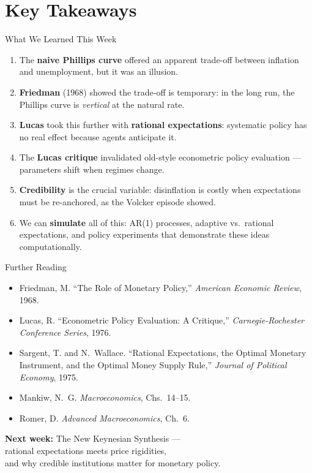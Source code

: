 \documentclass[aspectratio=169, 10pt]{beamer}
\begin{document}
\section{Key Takeaways}

\begin{frame}{What We Learned This Week}
\begin{enumerate}
  \item The \textbf{naive Phillips curve} offered an apparent trade-off between
        inflation and unemployment, but it was an illusion.
  \item \textbf{Friedman} (1968) showed the trade-off is temporary: in the long run,
        the Phillips curve is \textit{vertical} at the natural rate.
  \item \textbf{Lucas} took this further with \textbf{rational expectations}:
        systematic policy has no real effect because agents anticipate it.
  \item The \textbf{Lucas critique} invalidated old-style econometric policy
        evaluation --- parameters shift when regimes change.
  \item \textbf{Credibility} is the crucial variable: disinflation is costly
        when expectations must be re-anchored, as the Volcker episode showed.
  \item We can \textbf{simulate} all of this: AR(1) processes, adaptive vs.\
        rational expectations, and policy experiments that demonstrate
        these ideas computationally.
\end{enumerate}
\end{frame}

\begin{frame}{Further Reading}
\begin{itemize}
  \item Friedman, M. ``The Role of Monetary Policy,''
        \textit{American Economic Review}, 1968.
  \item Lucas, R. ``Econometric Policy Evaluation: A Critique,''
        \textit{Carnegie-Rochester Conference Series}, 1976.
  \item Sargent, T. and N.~Wallace. ``Rational Expectations, the Optimal
        Monetary Instrument, and the Optimal Money Supply Rule,''
        \textit{Journal of Political Economy}, 1975.
  \item Mankiw, N.~G. \textit{Macroeconomics}, Chs.~14--15.
  \item Romer, D. \textit{Advanced Macroeconomics}, Ch.~6.
\end{itemize}
\vspace{1em}
\begin{center}
\textbf{Next week:} The New Keynesian Synthesis ---\\
rational expectations meets price rigidities,\\
and why credible institutions matter for monetary policy.
\end{center}
\end{frame}
\end{document}
